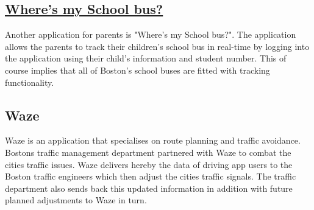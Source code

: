 \documentclass[a4paper,12pt]{report}
\begin{document}
		\subsection[Where's my School bus?]{\href{https://schoolbus.bostonpublicschools.org//}{Where's my School bus?}}
		\startsubsection
		Another application for parents is "Where's my School bus?". The application allows the parents to track their children's school bus in real-time by logging into the application using their child's information and student number. This of course implies that all of Boston's school buses are fitted with tracking functionality.
		\closesection		
		\subsection[Waze]{Waze \cite{InformationSuperhighway}}
		\startsubsection
			Waze is an application that specialises on route planning and traffic avoidance.
	Bostons traffic management department partnered with Waze to combat the cities traffic issues. Waze delivers hereby the data of driving app users to the Boston traffic engineers which then adjust the cities traffic signals. The traffic department also sends back this updated information in addition with future planned adjustments to Waze in turn.
		\closesection
\end{document}
